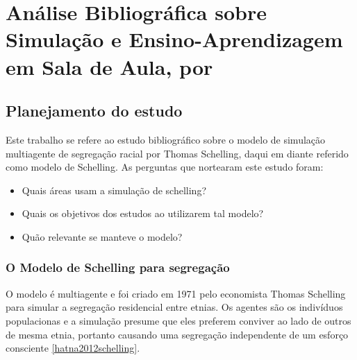 \chapter{Análise Bibliográfica sobre Simulação e Ensino-Aprendizagem em Sala de Aula, por \label{chap:bibliometria:bananaMoshpit}}

\section{Planejamento do estudo}\label{S@bananaMoshpit:planejamento}

Este trabalho se refere ao estudo bibliográfico sobre o modelo de simulação multiagente de segregação racial por Thomas Schelling, daqui em diante referido como modelo de Schelling. As perguntas que nortearam este estudo foram:
\begin{itemize}
    \item Quais áreas usam a simulação de schelling? 
    \item Quais os objetivos dos estudos ao utilizarem tal modelo?
    \item Quão relevante se manteve o modelo?
\end{itemize}

\subsection{O Modelo de Schelling para segregação}
O modelo é multiagente e foi criado em 1971 pelo economista Thomas Schelling para simular a segregação residencial entre etnias. Os agentes são os indivíduos populacionas e a simulação presume que eles preferem conviver ao lado de outros de mesma etnia, portanto causando uma segregação independente de um esforço consciente \ref{hatna2012schelling}. 

